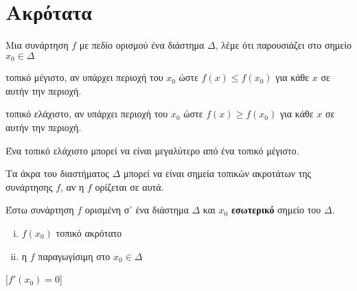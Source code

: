\section*{Ακρότατα}

\begin{dfn}
  Μια συνάρτηση $f$ με πεδίο ορισμού ένα διάστημα $\Delta$, λέμε ότι παρουσιάζει στο 
  σημείο $ x_{0} \in \Delta $
  \begin{myitemize}
    \item \textcolor{Col1}{τοπικό μέγιστο}, αν υπάρχει περιοχή του $ x_{0} $ ώστε $ f(x) 
      \leq f(x_{0}) $ για κάθε $x$ σε αυτήν την περιοχή.
    \item \textcolor{Col1}{τοπικό ελάχιστο}, αν υπάρχει περιοχή του $ x_{0} $ ώστε 
      $ f(x) \geq f(x_{0}) $ για κάθε $x$ σε αυτήν την περιοχή.
  \end{myitemize}
\end{dfn}

\begin{rem}
\item {}
  \begin{myitemize}
    \item Ένα τοπικό ελάχιστο μπορεί να είναι μεγαλύτερο από ένα τοπικό μέγιστο.
    \item Τα άκρα του διαστήματος $\Delta$ μπορεί να είναι σημεία τοπικών ακροτάτων της 
      συνάρτησης $f$, αν η $f$ ορίζεται σε αυτά.
  \end{myitemize}
\end{rem}

\begin{thmbreak}
  Έστω συνάρτηση $ f $ ορισμένη σ᾽ ένα διάστημα $\Delta$ και $ x_{0} $ 
  \textbf{εσωτερικό} σημείο του $\Delta$. 

  \begin{minipage}[t]{5.5 cm}
    \begin{enumerate}[i)]
      \item $f(x_{0})$ τοπικό ακρότατο \hfill {}
      \item η $ f $ παραγωγίσιμη στο $ x_{0} \in \Delta $  \hfill {}
    \end{enumerate}
    [$ f'(x_{0})=0 $]
  \end{minipage}
\end{thmbreak}

